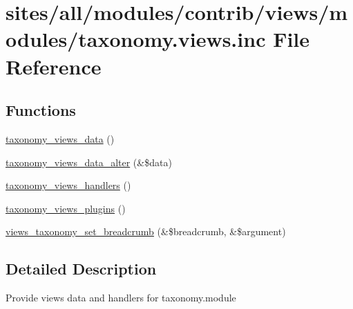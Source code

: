 \hypertarget{taxonomy_8views_8inc}{
\section{sites/all/modules/contrib/views/modules/taxonomy.views.inc File Reference}
\label{taxonomy_8views_8inc}
}
\subsection*{Functions}
\begin{CompactItemize}
\item 
\hyperlink{group__views__taxonomy__module_g7d924f539ca1e7da381929bec742e8fd}{taxonomy\_\-views\_\-data} ()
\item 
\hyperlink{group__views__taxonomy__module_ga6aab8471715a703a640f25f9cfe8efb}{taxonomy\_\-views\_\-data\_\-alter} (\&\$data)
\item 
\hyperlink{group__views__taxonomy__module_gacf596f7b32d4d15da0cbb2e26e44b7b}{taxonomy\_\-views\_\-handlers} ()
\item 
\hyperlink{group__views__taxonomy__module_gdf4c4ae0f65e3a97003ca804bfff4c9c}{taxonomy\_\-views\_\-plugins} ()
\item 
\hyperlink{group__views__taxonomy__module_ge3ea861745bda984b3d544ac856012e0}{views\_\-taxonomy\_\-set\_\-breadcrumb} (\&\$breadcrumb, \&\$argument)
\end{CompactItemize}


\subsection{Detailed Description}
Provide views data and handlers for taxonomy.module 